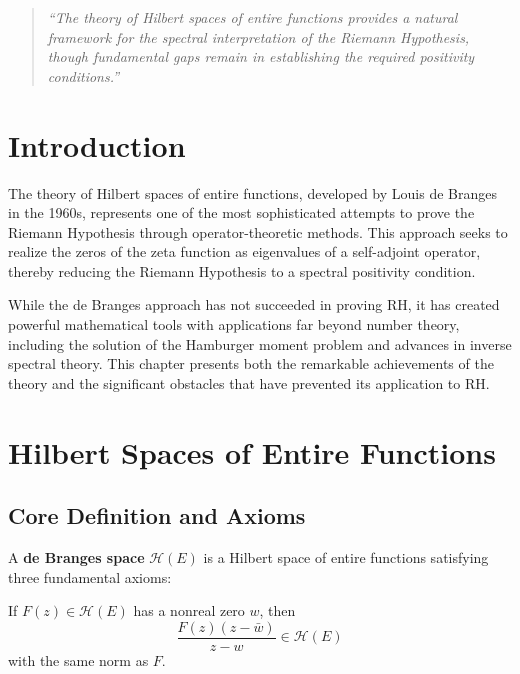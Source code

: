 
\begin{quote}
\textit{``The theory of Hilbert spaces of entire functions provides a natural framework for the spectral interpretation of the Riemann Hypothesis, though fundamental gaps remain in establishing the required positivity conditions.''}
\end{quote}

\section{Introduction}

The theory of Hilbert spaces of entire functions, developed by Louis de Branges in the 1960s, represents one of the most sophisticated attempts to prove the Riemann Hypothesis through operator-theoretic methods. This approach seeks to realize the zeros of the zeta function as eigenvalues of a self-adjoint operator, thereby reducing the Riemann Hypothesis to a spectral positivity condition.

While the de Branges approach has not succeeded in proving RH, it has created powerful mathematical tools with applications far beyond number theory, including the solution of the Hamburger moment problem and advances in inverse spectral theory. This chapter presents both the remarkable achievements of the theory and the significant obstacles that have prevented its application to RH.

\section{Hilbert Spaces of Entire Functions}
\label{sec:hilbert-spaces-entire}

\subsection{Core Definition and Axioms}

\begin{definition}
A \textbf{de Branges space} $\mathcal{H}(E)$ is a Hilbert space of entire functions satisfying three fundamental axioms:
\end{definition}

\begin{axiom}
If $F(z) \in \mathcal{H}(E)$ has a nonreal zero $w$, then 
$$\frac{F(z)(z-\bar{w})}{z-w} \in \mathcal{H}(E)$$
with the same norm as $F$.
\end{axiom}

